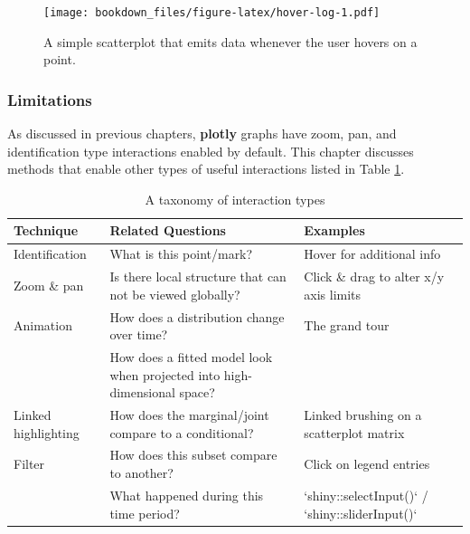 \documentclass[12pt,]{isuthesis}
\newenvironment{Shaded}{\begin{snugshade}}{\end{snugshade}}
\newcommand{\KeywordTok}[1]{\textcolor[rgb]{0.13,0.29,0.53}{\textbf{{#1}}}}
\newcommand{\DataTypeTok}[1]{\textcolor[rgb]{0.13,0.29,0.53}{{#1}}}
\newcommand{\StringTok}[1]{\textcolor[rgb]{0.31,0.60,0.02}{{#1}}}
\newcommand{\NormalTok}[1]{{#1}}
\begin{document}
\begin{Shaded}
\end{Shaded}

\begin{figure}[htbp]
\centering
\texttt{[image: bookdown\_files/figure-latex/hover-log-1.pdf]}
\caption{\label{fig:hover-log}A simple scatterplot that emits data whenever
the user hovers on a point.}
\end{figure}

\subsubsection{Limitations}\label{limitations}

As discussed in previous chapters, \textbf{plotly} graphs have zoom,
pan, and identification type interactions enabled by default. This
chapter discusses methods that enable other types of useful interactions
listed in Table \ref{tab:techniques}.

\begin{table}

\caption{\label{tab:techniques}A taxonomy of interaction types}
\centering
\begin{tabular}[t]{lll}
\toprule
Technique & Related Questions & Examples\\
\midrule
Identification & What is this point/mark? & Hover for additional info\\
Zoom \& pan & Is there local structure that can not be viewed globally? & Click \& drag to alter x/y axis limits\\
Animation & How does a distribution change over time? & The grand tour\\
 & How does a fitted model look when projected into high-dimensional space? & \\
Linked highlighting & How does the marginal/joint compare to a conditional? & Linked brushing on a scatterplot matrix\\
\addlinespace
Filter & How does this subset compare to another? & Click on legend entries\\
 & What happened during this time period? & `shiny::selectInput()` / `shiny::sliderInput()`\\
\bottomrule
\end{tabular}
\end{table}
\end{document}
